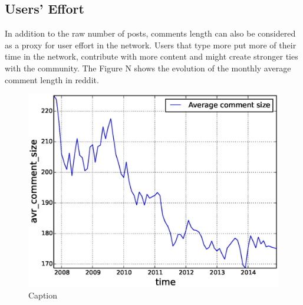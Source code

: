 



\subsection{Users' Effort}

In addition to the raw number of posts, comments length can also be considered as a proxy for user effort in the network. Users that type more put more of their time in the network, contribute with more content and might create stronger ties with the community. The Figure N shows the evolution of the monthly average comment length in reddit.

\begin{figure}[!tb]
\centering
\includegraphics[scale=0.4]{./images/avr_comment_size_over_time_total.eps}
\caption{Caption}
\label{fig:avr_comment_size_over_time_total}
\end{figure}

